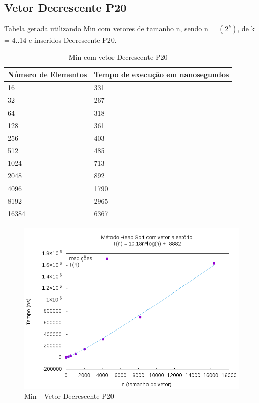 \documentclass[12pt,a4paper,twoside]{report}
\begin{document}
\subsection{Vetor Decrescente P20}
Tabela gerada utilizando Min com vetores de tamanho n, sendo n = $(2^k)$, de k = 4..14 e inseridos Decrescente P20.
\begin{table}[H]
\centering
\caption{Min com vetor Decrescente P20}
\label{my-label}
\begin{tabular}{|l|l|}
\hline
\multicolumn{1}{|c|}{\textbf{Número de Elementos}} & \multicolumn{1}{c|}{\textbf{Tempo de execução em nanosegundos}} \\ \hline
16 & 331 \\ \hline
32 & 267 \\ \hline
64 & 318 \\ \hline
128 & 361 \\ \hline
256 & 403 \\ \hline
512 & 485 \\ \hline
1024 & 713 \\ \hline
2048 & 892 \\ \hline
4096 & 1790 \\ \hline
8192 & 2965 \\ \hline
16384 & 6367 \\ \hline

\end{tabular}
\end{table}

\begin{figure}[H]
    \centering
    \includegraphics[width=0.7\linewidth]{graficos/HeapSort/vIntAleatorio/vIntAleatorio.png}
  \caption{Min - Vetor Decrescente P20}
\end{figure}
\end{document}
